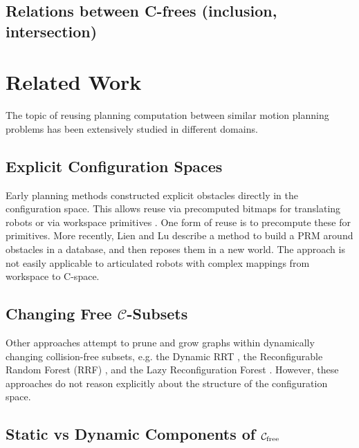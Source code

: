 \subsection{Relations between C-frees (inclusion, intersection)}

\section{Related Work}

The topic of reusing planning computation
between similar motion planning problems
has been extensively studied in different domains.

\subsection{Explicit Configuration Spaces}

Early planning methods constructed explicit obstacles
directly in the configuration space.
This allows reuse via precomputed bitmaps
for translating robots \cite{kavraki1995cspacefft}
or via workspace primitives \cite{newmanbranicky1991cspacetransforms}.
One form of reuse is to precompute these for primitives.
More recently,
Lien and Lu \cite{lien2009similarobstacles} describe a method to
build a PRM around obstacles in a database,
and then reposes them in a new world.
The approach is not easily applicable to articulated robots
with complex mappings from workspace to C-space.

\subsection{Changing Free $\mathcal{C}$-Subsets}

Other approaches attempt to prune and grow graphs
within dynamically changing collision-free subsets,
e.g. the Dynamic RRT \cite{ferguson2006drrt},
the Reconfigurable Random Forest (RRF)
\cite{li2002incrementalprmmanagement},
and the Lazy Reconfiguration Forest
\cite{gayle2007lazyreconfigforest}.
However, these approaches do not reason explicitly about the
structure of the configuration space.

\subsection{Static vs Dynamic Components of
   $\mathcal{C}_{\mbox{\scriptsize free}}$}

